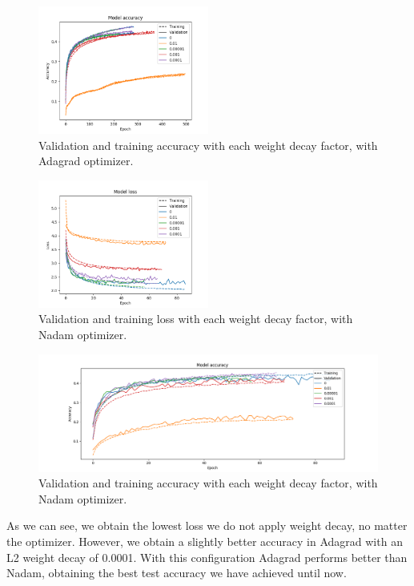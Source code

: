 \documentclass[]{article}
\begin{document}
\begin{figure}[H]
	\centering
	\includegraphics[width=0.5\textwidth]{weight2_adagrad_acc}
	\caption{Validation and training accuracy with each weight decay factor, with Adagrad optimizer.}
	\label{f:ker6}
\end{figure}

\begin{figure}[H]
	\centering
	\includegraphics[width=0.5\textwidth]{weight2_nadam_loss}
	\caption{Validation and training loss with each weight decay factor, with Nadam optimizer.}
	\label{f:ker7}
\end{figure}

\begin{figure}[H]
	\centering
	\includegraphics[width=\textwidth]{weight2_nadam_acc}
	\caption{Validation and training accuracy with each weight decay factor, with Nadam optimizer.}
	\label{f:ker8}
\end{figure}

As we can see, we obtain the lowest loss we do not apply weight decay, no matter the optimizer. However, we obtain a slightly better accuracy in Adagrad with an L2 weight decay of 0.0001. With this configuration Adagrad performs better than Nadam, obtaining the best test accuracy we have achieved until now.
\end{document}
